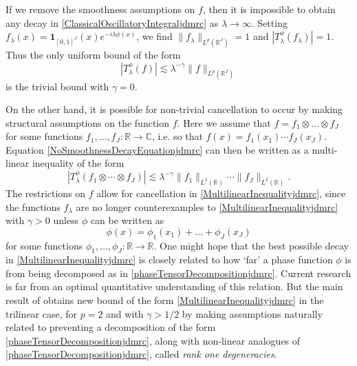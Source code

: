 \documentclass[12pt]{amsart}
\def\C{\mathbb{C}}
\newcommand*{\R}{\mathbb{R}}
\begin{document}
If we remove the smoothness assumptions on $f$, then it is impossible to obtain any decay in \eqref{ClassicalOscillatoryIntegraljdmrc} as $\lambda \to \infty$. Setting
$f_\lambda(x) = \boldsymbol{1}_{[0,1]^J}(x) e^{-i \lambda \phi(x)}$, we find $\| f_\lambda \|_{L^p(\R^J)} = 1$ and $|T^\phi_\lambda(f_\lambda)| = 1$. Thus the only uniform bound of the form
%
\begin{equation} \label{NoSmoothnessDecayEquationjdmrc}
    | T^\phi_\lambda(f)| \lesssim \lambda^{-\gamma} \| f \|_{L^p(\R^J)}
\end{equation}
%
is the trivial bound with $\gamma = 0$. 

On the other hand, it is possible for non-trivial cancellation to occur by making structural assumptions on the function $f$. Here we assume that $f = f_1 \otimes \dots \otimes f_J$ for some functions $f_1,\dots,f_J: \R \to \C$, i.e. so that $f(x) = f_1(x_1) \cdots f_J(x_J)$. Equation \eqref{NoSmoothnessDecayEquationjdmrc} can then be written as a multi-linear inequality of the form
%
\begin{equation} \label{MultilinearInequalityjdmrc}
    | T^\phi_\lambda(f_1 \otimes \cdots \otimes f_J) | \lesssim \lambda^{-\gamma} \| f_1 \|_{L^2(\R)} \cdots \| f_J \|_{L^2(\R)}.
\end{equation}
%
The restrictions on $f$ allow for cancellation in \eqref{MultilinearInequalityjdmrc}, since the functions $f_\lambda$ are no longer counterexamples to \eqref{MultilinearInequalityjdmrc} with $\gamma > 0$ unless $\phi$ can be written as
%
\begin{equation} \label{phaseTensorDecompositionjdmrc}
    \phi(x) = \phi_1(x_1) + \dots + \phi_J(x_J)
\end{equation}
%
for some functions $\phi_1,\dots,\phi_J: \R \to \R$. One might hope that the best possible decay in \eqref{MultilinearInequalityjdmrc} is closely related to how `far' a phase function $\phi$ is from being decomposed as in \eqref{phaseTensorDecompositionjdmrc}. Current research is far from an optimal quantitative understanding of this relation. But the main result of \cite{ChristTopicPaperjdmrc} obtains new bound of the form \eqref{MultilinearInequalityjdmrc} in the trilinear case, for $p = 2$ and with $\gamma > 1/2$ by making assumptions naturally related to preventing a decomposition of the form \eqref{phaseTensorDecompositionjdmrc}, along with non-linear analogues of \eqref{phaseTensorDecompositionjdmrc}, called \emph{rank one degeneracies}.
\end{document}
